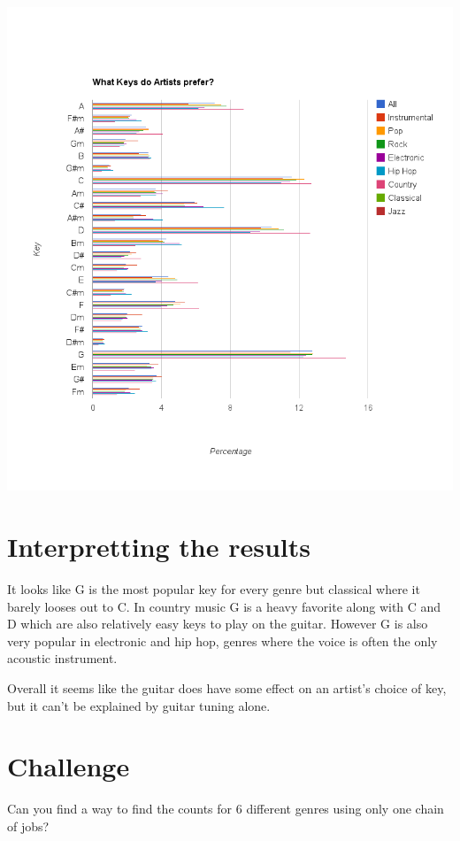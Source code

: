 \documentclass[letterpaper,10pt,openany,oneside]{sphinxmanual}
\begin{document}
{\hfill\includegraphics{keyChart.png}\hfill}


\section{Interpretting the results}
\label{1-Keys/Keys:interpretting-the-results}
It looks like G is the most popular key for every genre but
classical where it barely looses out to C. In country music G
is a heavy favorite along with C and D which are also relatively
easy keys to play on the guitar. However G is also very popular
in electronic and hip hop, genres where the voice is often the
only acoustic instrument.

Overall it seems like the guitar does have some effect on an
artist's choice of key, but it can't be explained by guitar
tuning alone.


\section{Challenge}
\label{1-Keys/Keys:challenge}
Can you find a way to find the counts for 6 different genres using only
one chain of jobs?
\end{document}
